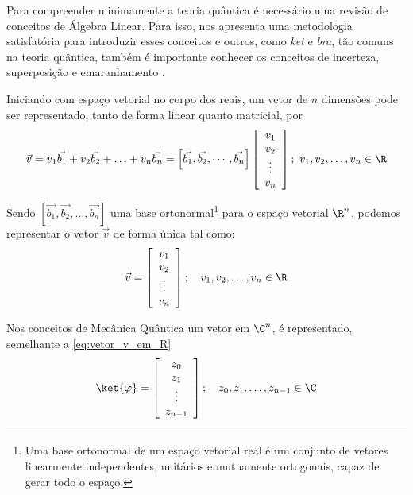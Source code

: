 Para compreender minimamente a teoria quântica é necessário uma revisão de conceitos de Álgebra Linear. Para isso, \textcite{Almeida2020} nos apresenta uma metodologia satisfatória para introduzir esses conceitos e outros, como \textit{ket} e \textit{bra}, tão comuns na teoria quântica, também é importante conhecer os conceitos de incerteza, superposição e emaranhamento \cite{hewitt2000fundamentos, mahon2000mecanica}. 

Iniciando com espaço vetorial no corpo dos reais, um vetor de $n$ dimensões pode ser representado, tanto de forma linear quanto matricial, por
$$
    \vec{v} = v_1\vec{b_1}+v_2\vec{b_2}+\ldots+v_n\vec{b_n}=\left[\vec{b_1}, \vec{b_2},\cdots, \vec{b_n}\right]\left[\begin{array}{c}
         v_1\\
         v_2\\ 
         \vdots\\
         v_n
    \end{array}\right];\ v_1, v_2,\ldots, v_n \in \R
$$

Sendo $\left[\vec{b_1}, \vec{b_2},\dots, \vec{b_n}\right]$ uma base ortonormal\footnote{Uma base ortonormal de um espaço vetorial real é um conjunto de vetores linearmente independentes, unitários e mutuamente ortogonais, capaz de gerar todo o espaço.} para o espaço vetorial $\R^n$, podemos representar o vetor $\vec{v}$ de forma única tal como:
\begin{equation}
    \label{eq:vetor_v_em_R}
    \vec{v}=\left[\begin{array}{c}
         v_1\\
         v_2\\ 
         \vdots\\
         v_n
    \end{array}\right];\quad v_1, v_2,\ldots, v_n \in \R
\end{equation} 

Nos conceitos de Mecânica Quântica um vetor em $\C^n$, é representado, semelhante a \autoref{eq:vetor_v_em_R}
$$
    \label{eq:vetor_em_C}
    \ket{\varphi} = \left[\begin{array}{c}
         z_0 \\
         z_1 \\
         \vdots \\
         z_{n-1}
    \end{array}\right];\quad z_0,z_1,\ldots, z_{n-1}\in\C
$$

